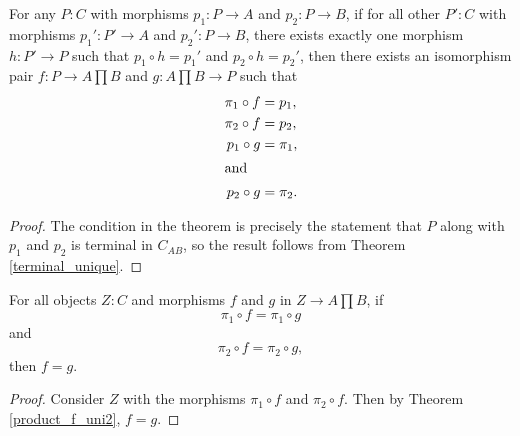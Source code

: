 \documentclass[../math.tex]{subfiles}
\begin{document}
\begin{theorem} \label{product_unique}
    For any $P : C$ with morphisms $p_1 : P \to A$ and $p_2 : P \to B$, if for
    all other $P' : C$ with morphisms $p_1' : P' \to A$ and $p_2' : P \to B$,
    there exists exactly one morphism $h : P' \to P$ such that $p_1 \circ h =
    p_1'$ and $p_2 \circ h = p_2'$, then there exists an isomorphism pair $f : P
    \to A \prod B$ and $g : A \prod B \to P$ such that
    \begin{align*}
        \pi_1 \circ f &= p_1, \\
        \pi_2 \circ f &= p_2, \\
        p_1 \circ g &= \pi_1, \\
    \intertext{and}
        p_2 \circ g &= \pi_2.
    \end{align*}
\end{theorem}
\begin{proof}
    The condition in the theorem is precisely the statement that $P$ along with
    $p_1$ and $p_2$ is terminal in $C_{AB}$, so the result follows from Theorem
    \ref{terminal_unique}.
\end{proof}

\begin{theorem} \label{product_mono}
    For all objects $Z : C$ and morphisms $f$ and $g$ in $Z \to A \prod B$,
    if
    \[
        \pi_1 \circ f = \pi_1 \circ g
    \]
    and
    \[
        \pi_2 \circ f = \pi_2 \circ g,
    \]
    then $f = g$.
\end{theorem}
\begin{proof}
    Consider $Z$ with the morphisms $\pi_1 \circ f$ and $\pi_2 \circ f$.  Then
    by Theorem \ref{product_f_uni2}, $f = g$.
\end{proof}
\end{document}
